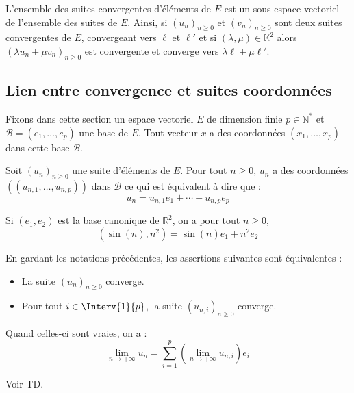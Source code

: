 \documentclass[a4paper,10pt]{report}
\begin{document}
\begin{prop} L'ensemble des suites convergentes d'éléments de $E$ est un sous-espace vectoriel de l'ensemble des suites de $E$. Ainsi, si $(u_n)_{n \geq 0}$ et $(v_n)_{n \geq 0}$ sont deux suites convergentes de $E$, convergeant vers $\ell$ et $\ell'$ et si $(\lambda, \mu) \in \mathbb{K}^2$ alors $(\lambda u_n + \mu v_n)_{n \geq 0}$ est convergente et converge vers $\lambda \ell + \mu \ell'$.
\end{prop}


\subsection{Lien entre convergence et suites coordonnées}

\noindent Fixons dans cette section un espace vectoriel $E$ de dimension finie $p \in \mathbb{N}^*$ et $\mathcal{B} = (e_1, \ldots, e_p)$ une base de $E$. Tout vecteur $x$ a des coordonnées $(x_1, \ldots, x_p)$ dans cette base $\mathcal{B}$. 

\noindent Soit $(u_n)_{n \geq 0}$ une suite d'éléments de $E$. Pour tout $n \geq 0$, $u_n$ a des coordonnées $((u_{n,1}, \ldots, u_{n,p}))$ dans $\mathcal{B}$ ce qui est équivalent à dire que :
$$ u_n = u_{n,1} e_1 + \cdots + u_{n,p} e_p $$

\begin{ex} Si $(e_1,e_2)$ est la base canonique de $\mathbb{R}^2$, on a pour tout $n \geq 0$,
$$ (\sin(n),n^2) = \sin(n) e_1 + n^2e_2$$
\end{ex}

\begin{thm} En gardant les notations précédentes, les assertions suivantes sont équivalentes :
\begin{itemize}
\item La suite $(u_n)_{n \geq 0}$ converge.
\item Pour tout $i \in \Interv{1}{p}$, la suite $(u_{n,i})_{n \geq 0}$ converge.
\end{itemize}
Quand celles-ci sont vraies, on a :
$$ \lim_{n \rightarrow + \infty} u_n = \sum_{i=1}^p \left(\lim_{n \rightarrow + \infty} u_{n,i} \right) e_i $$
\end{thm}

\begin{preuve} Voir TD.
\end{preuve}
\end{document}
